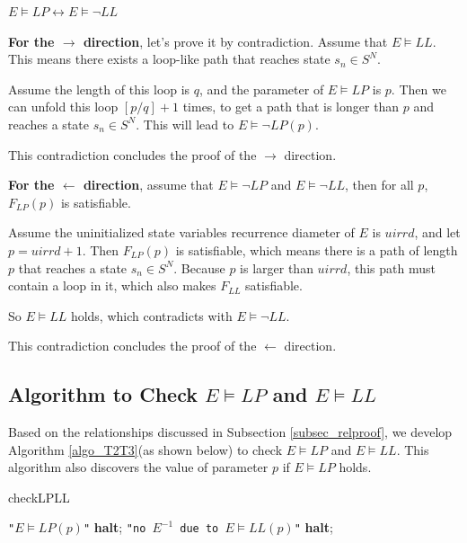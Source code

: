 \documentclass[journal]{IEEEtran}
\begin{document}
\begin{theorem}\label{T2toT3}
$E\vDash LP\leftrightarrow E\vDash\neg LL$
\end{theorem}
\begin{IEEEproof}
\textbf{For the $\to$ direction},
let's prove it by contradiction.
Assume that $E\vDash LL$.
This means there exists a loop-like path that reaches state $s_n\in S^{N}$.

Assume the length of this loop is $q$,
and the parameter of $E\vDash LP$ is $p$.
Then we can unfold this loop $[p/q]+1$ times,
to get a path that is longer than $p$
and reaches a state $s_n\in S^{N}$.
This will lead to $E\vDash\neg LP(p)$.

This contradiction concludes the proof of the $\to$ direction.

\textbf{For the $\gets$ direction},
assume that $E\vDash\neg LP$ and $E\vDash\neg LL$,
then for all $p$,
$F_{LP}(p)$ is satisfiable.

Assume the uninitialized state variables recurrence diameter of $E$ is $uirrd$,
and let $p=uirrd+1$.
Then $F_{LP}(p)$ is satisfiable,
which means there is a path of length $p$ that reaches a state $s_n\in S^{N}$.
Because $p$ is larger than $uirrd$,
this path must contain a loop in it,
which also makes $F_{LL}$ satisfiable.

So $E\vDash LL$ holds,
which contradicts with $E\vDash\neg LL$.

This contradiction concludes the proof of the $\gets$ direction.
\end{IEEEproof}

\subsection{Algorithm to Check $E\vDash LP$ and $E\vDash LL$}\label{subsec_t1t2}
Based on the relationships discussed in Subsection \ref{subsec_relproof},
we develop Algorithm \ref{algo_T2T3}(as shown below) to check $E\vDash LP$ and $E\vDash LL$.
This algorithm also discovers the value of parameter $p$ if $E\vDash LP$ holds.

\begin{algorithm}
\caption{checkLPLL}
\label{algo_T2T3}
\begin{algorithmic}[1]
\PRINT \texttt{"$E\vDash LP(p)$"}\label{lab_t2}
\STATE \textbf{halt};
\PRINT \texttt{"no $E^{-1}$ due to $E\vDash LL(p)$"}\label{lab_t3}
\STATE \textbf{halt};
\ENDIF
\ENDFOR
\end{algorithmic}
\end{algorithm}
\end{document}
